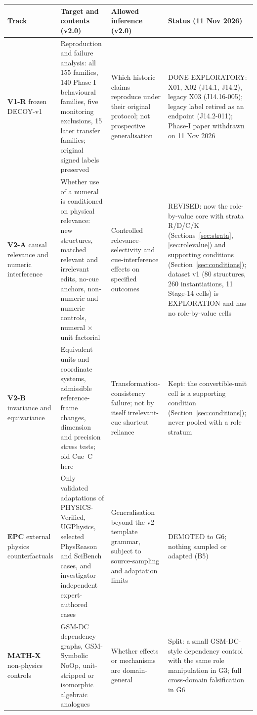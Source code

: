 \documentclass[10pt,a4paper]{article}
\begin{document}
\begin{center}\small
\begin{tabularx}{\linewidth}{@{}P{2.3cm}P{4.4cm}P{3.4cm}L@{}}
\toprule
Track & Target and contents (v2.0) & Allowed inference (v2.0) & Status (11 Nov 2026) \\
\midrule
\textbf{V1-R} frozen DECOY-v1 & Reproduction and failure analysis: all 155 families, 140 Phase-I behavioural
families, five monitoring exclusions, 15 later transfer families; original signed labels preserved &
Which historic claims reproduce under their original protocol; not prospective generalisation &
DONE-EXPLORATORY: X01, X02 (J14.1, J14.2), legacy X03 (J14.16-005); legacy label retired as an endpoint
(J14.2-011); Phase-I paper withdrawn on 11 Nov 2026 \\
\textbf{V2-A} causal relevance and numeric interference & Whether use of a numeral is conditioned on physical
relevance: new structures, matched relevant and irrelevant edits, no-cue anchors, non-numeric and numeric
controls, numeral $\times$ unit factorial & Controlled relevance-selectivity and cue-interference effects on
specified outcomes & REVISED: now the role-by-value core with strata R/D/C/K
(Sections~\ref{sec:strata}, \ref{sec:rolevalue}) and supporting conditions (Section~\ref{sec:conditions});
dataset v1 (80 structures, 260 instantiations, 11 Stage-14 cells) is EXPLORATION and has no role-by-value
cells \\
\textbf{V2-B} invariance and equivariance & Equivalent units and coordinate systems, admissible
reference-frame changes, dimension and precision stress tests; old Cue~C here & Transformation-consistency
failure; not by itself irrelevant-cue shortcut reliance & Kept: the convertible-unit cell is a supporting
condition (Section~\ref{sec:conditions}); never pooled with a role stratum \\
\textbf{EPC} external physics counterfactuals & Only validated adaptations of PHYSICS-Verified, UGPhysics,
selected PhysReason and SciBench cases, and investigator-independent expert-authored cases & Generalisation beyond
the v2 template grammar, subject to source-sampling and adaptation limits & DEMOTED to G6; nothing sampled or
adapted (B5) \\
\textbf{MATH-X} non-physics controls & GSM-DC dependency graphs, GSM-Symbolic NoOp, unit-stripped or isomorphic
algebraic analogues & Whether effects or mechanisms are domain-general & Split: a small GSM-DC-style dependency
control with the same role manipulation in G3; full cross-domain falsification in G6 \\
\bottomrule
\end{tabularx}
\end{center}
\end{document}
